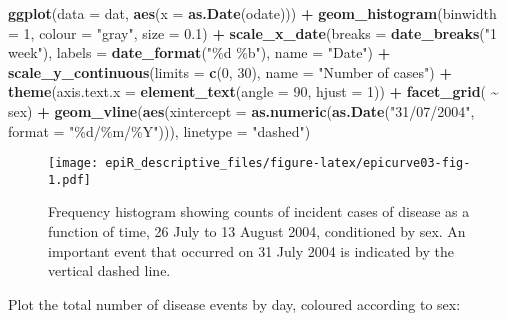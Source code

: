 \documentclass[
]{article}
\newenvironment{Shaded}{\begin{snugshade}}{\end{snugshade}}
\newcommand{\DataTypeTok}[1]{\textcolor[rgb]{0.13,0.29,0.53}{#1}}
\newcommand{\DecValTok}[1]{\textcolor[rgb]{0.00,0.00,0.81}{#1}}
\newcommand{\FloatTok}[1]{\textcolor[rgb]{0.00,0.00,0.81}{#1}}
\newcommand{\KeywordTok}[1]{\textcolor[rgb]{0.13,0.29,0.53}{\textbf{#1}}}
\newcommand{\NormalTok}[1]{#1}
\newcommand{\OperatorTok}[1]{\textcolor[rgb]{0.81,0.36,0.00}{\textbf{#1}}}
\newcommand{\StringTok}[1]{\textcolor[rgb]{0.31,0.60,0.02}{#1}}
\begin{document}
\begin{Shaded}
\begin{Highlighting}[]

\KeywordTok{ggplot}\NormalTok{(}\DataTypeTok{data =}\NormalTok{ dat, }\KeywordTok{aes}\NormalTok{(}\DataTypeTok{x =} \KeywordTok{as.Date}\NormalTok{(odate))) }\OperatorTok{+}
\StringTok{  }\KeywordTok{geom\_histogram}\NormalTok{(}\DataTypeTok{binwidth =} \DecValTok{1}\NormalTok{, }\DataTypeTok{colour =} \StringTok{"gray"}\NormalTok{, }\DataTypeTok{size =} \FloatTok{0.1}\NormalTok{) }\OperatorTok{+}
\StringTok{  }\KeywordTok{scale\_x\_date}\NormalTok{(}\DataTypeTok{breaks =} \KeywordTok{date\_breaks}\NormalTok{(}\StringTok{"1 week"}\NormalTok{), }\DataTypeTok{labels =} \KeywordTok{date\_format}\NormalTok{(}\StringTok{"\%d \%b"}\NormalTok{), }
     \DataTypeTok{name =} \StringTok{"Date"}\NormalTok{) }\OperatorTok{+}
\StringTok{  }\KeywordTok{scale\_y\_continuous}\NormalTok{(}\DataTypeTok{limits =} \KeywordTok{c}\NormalTok{(}\DecValTok{0}\NormalTok{, }\DecValTok{30}\NormalTok{), }\DataTypeTok{name =} \StringTok{"Number of cases"}\NormalTok{) }\OperatorTok{+}
\StringTok{  }\KeywordTok{theme}\NormalTok{(}\DataTypeTok{axis.text.x =} \KeywordTok{element\_text}\NormalTok{(}\DataTypeTok{angle =} \DecValTok{90}\NormalTok{, }\DataTypeTok{hjust =} \DecValTok{1}\NormalTok{)) }\OperatorTok{+}\StringTok{ }
\StringTok{  }\KeywordTok{facet\_grid}\NormalTok{( }\OperatorTok{\textasciitilde{}}\StringTok{ }\NormalTok{sex) }\OperatorTok{+}\StringTok{ }
\StringTok{  }\KeywordTok{geom\_vline}\NormalTok{(}\KeywordTok{aes}\NormalTok{(}\DataTypeTok{xintercept =} \KeywordTok{as.numeric}\NormalTok{(}\KeywordTok{as.Date}\NormalTok{(}\StringTok{"31/07/2004"}\NormalTok{, }\DataTypeTok{format =} \StringTok{"\%d/\%m/\%Y"}\NormalTok{))), }
   \DataTypeTok{linetype =} \StringTok{"dashed"}\NormalTok{)}
\end{Highlighting}
\end{Shaded}

\begin{figure}
\centering
\texttt{[image: epiR\_descriptive\_files/figure-latex/epicurve03-fig-1.pdf]}
\caption{\label{fig:epicurve03}Frequency histogram showing counts of
incident cases of disease as a function of time, 26 July to 13 August
2004, conditioned by sex. An important event that occurred on 31 July
2004 is indicated by the vertical dashed line.}
\end{figure}

Plot the total number of disease events by day, coloured according to
sex:
\end{document}
